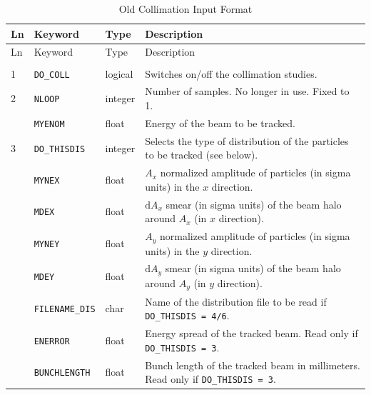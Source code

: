 \bigskip
\begin{center}
\begin{longtable}{| p{0.5cm} | p{2.4cm} | p{1.2cm} | >{\raggedright\arraybackslash}p{11.4cm}|}
    \caption{Old Collimation Input Format}
    \label{tab:COLL_INP} \\*
    \hline
    \rowcolor{blue!30}
    Ln & Keyword & Type & Description \\*
    \hline
    \endfirsthead

    \hline
    \rowcolor{blue!30}
    Ln & Keyword & Type & Description \\*
    \hline
    \endhead

    \rowcolor{gray!15}
    \multicolumn{4}{|c|}{(The table continues on the next page)}\\*
    \hline
    \endfoot

    \hline
    \endlastfoot

    1   & \texttt{DO\_COLL}      & logical & Switches on/off the collimation studies. \\
    \hline

    2   & \texttt{NLOOP}         & integer & Number of samples. No longer in use. Fixed to 1. \\
        \cline{2-4}
        & \texttt{MYENOM}        & float   & Energy of the beam to be tracked. \\
    \hline

    3   & \texttt{DO\_THISDIS}   & integer & Selects the type of distribution of the particles to be tracked (see below). \\
        \cline{2-4}
        & \texttt{MYNEX}         & float   & $A_x$ normalized amplitude of particles (in sigma units) in the $x$ direction. \\
        \cline{2-4}
        & \texttt{MDEX}          & float   & $\mbox{d}A_x$ smear (in sigma units) of the beam halo around $A_x$ (in $x$ direction). \\
        \cline{2-4}
        & \texttt{MYNEY}         & float   & $A_y$ normalized amplitude of particles (in sigma units) in the $y$ direction. \\
        \cline{2-4}
        & \texttt{MDEY}          & float   & $\mbox{d}A_y$ smear (in sigma units) of the beam halo around $A_y$ (in $y$ direction). \\
        \cline{2-4}
        & \texttt{FILENAME\_DIS} & char    & Name of the distribution file to be read if \texttt{DO\_THISDIS = 4/6}. \\
        \cline{2-4}
        & \texttt{ENERROR}       & float   & Energy spread of the tracked beam. Read only if \texttt{DO\_THISDIS = 3}. \\
        \cline{2-4}
        & \texttt{BUNCHLENGTH}   & float   & Bunch length of the tracked beam in millimeters. Read only if \texttt{DO\_THISDIS = 3}. \\
    \hline


\end{longtable}
\end{center}
